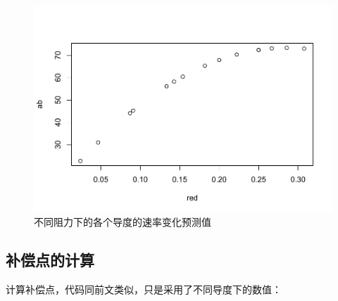 \documentclass[
]{krantz}
\makeatletter
\newenvironment{Shaded}{\begin{snugshade}}{\end{snugshade}}
\newcommand{\DecValTok}[1]{\textcolor[rgb]{0.00,0.00,0.81}{#1}}
\newcommand{\FunctionTok}[1]{\textcolor[rgb]{0.00,0.00,0.00}{#1}}
\newcommand{\NormalTok}[1]{#1}
\newcommand{\OtherTok}[1]{\textcolor[rgb]{0.56,0.35,0.01}{#1}}
\newcommand{\SpecialCharTok}[1]{\textcolor[rgb]{0.00,0.00,0.00}{#1}}
\newenvironment{kframe}{%
\medskip{}
\setlength{\fboxsep}{.8em}
 \def\at@end@of@kframe{}%
 \ifinner\ifhmode%
  \def\at@end@of@kframe{\end{minipage}}%
  \begin{minipage}{\columnwidth}%
 \fi\fi%
 \def\FrameCommand##1{\hskip\@totalleftmargin \hskip-\fboxsep
 \colorbox{shadecolor}{##1}\hskip-\fboxsep
     \hskip-\linewidth \hskip-\@totalleftmargin \hskip\columnwidth}%
 \MakeFramed {\advance\hsize-\width
   \@totalleftmargin\z@ \linewidth\hsize
   \@setminipage}}%
 {\par\unskip\endMakeFramed%
 \at@end@of@kframe}
\renewenvironment{Shaded}{\begin{kframe}}{\end{kframe}}
\makeatother
\begin{document}
\begin{Shaded}
\end{Shaded}

\begin{figure}
\centering
\includegraphics{bookdown_files/figure-latex/tolre-1.pdf}
\caption{\label{fig:tolre}不同阻力下的各个导度的速率变化预测值}
\end{figure}

\hypertarget{multi14}{%
\subsection{补偿点的计算}\label{multi14}}

计算补偿点，代码同前文类似，只是采用了不同导度下的数值：
\end{document}
